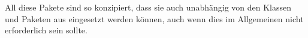 \documentclass[a4paper,11pt]{tubsreprt}
\begin{document}
All diese Pakete sind so konzipiert, dass sie auch unabhängig von den
Klassen und Paketen aus \tubslatex eingesetzt werden können, auch wenn dies
im Allgemeinen nicht erforderlich sein sollte.







\appendix





\end{document}
